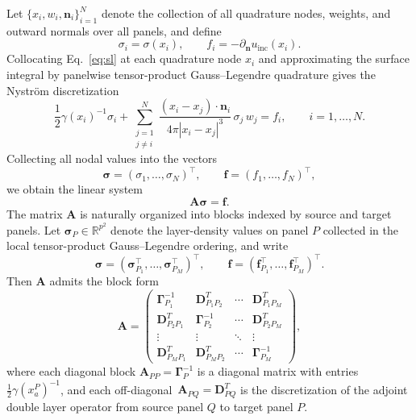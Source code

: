 \documentclass[preprint,12pt]{elsarticle}
\newcommand{\V}[1]{\boldsymbol{#1}}
\newcommand{\M}[1]{\boldsymbol{#1}}
\begin{document}
Let $\{x_i,w_i,\V{n}_i\}_{i=1}^N$ denote the collection of all quadrature nodes, weights, and outward normals over all panels, and define
\begin{equation}
\sigma_i = \sigma(x_i), \qquad
f_i = -\partial_{\V n}u_{\mathrm{inc}}(x_i).
\end{equation}
Collocating Eq.~\eqref{eq:sl} at each quadrature node $x_i$ and approximating the surface integral by panelwise tensor-product Gauss--Legendre quadrature gives the Nystr\"om discretization
\begin{equation}\label{eq:nystrom_discrete}
    \frac{1}{2}\gamma(x_i)^{-1}\sigma_i
    +
    \sum_{\substack{j=1 \\ j\neq i}}^{N}
    \frac{(x_i-x_j)\cdot \V{n}_i}{4\pi |x_i-x_j|^3}\,
    \sigma_j\,w_j
    =
    f_i,
    \qquad i=1,\dots,N.
\end{equation}
Collecting all nodal values into the vectors
\begin{equation}
\V{\sigma} = (\sigma_1,\dots,\sigma_N)^\top,
\qquad
\V{f} = (f_1,\dots,f_N)^\top,
\end{equation}
we obtain the linear system
\begin{equation}\label{eq:linsys}
    \M{A}\V{\sigma} = \V{f}.
\end{equation}
The matrix $\M A$ is naturally organized into blocks indexed by source and target panels.
Let $\V\sigma_P\in\mathbb{R}^{p^2}$ denote the layer-density values on panel $P$ collected in the local tensor-product Gauss--Legendre ordering, and write
\begin{equation}
    \V\sigma = (\V\sigma_{P_1}^\top,\dots,\V\sigma_{P_M}^\top)^\top,
    \qquad
    \V f = (\V f_{P_1}^\top,\dots,\V f_{P_M}^\top)^\top.
\end{equation}
Then $\M A$ admits the block form
\begin{equation}\label{eq:linsys_blocked}
    \M A =
    \begin{pmatrix}
        \M \Gamma^{-1}_{P_1} & \M D^T_{P_1 P_2} & \cdots & \M D^T_{P_1 P_M}\\
        \M D^T_{P_2 P_1} & \M \Gamma^{-1}_{P_2} & \cdots & \M D^T_{P_2 P_M}\\
        \vdots         & \vdots         & \ddots & \vdots\\
        \M D^T_{P_M P_1} & \M D^T_{P_M P_2} & \cdots & \M \Gamma^{-1}_{P_M}
    \end{pmatrix},
\end{equation}
where each diagonal block $\M A_{PP} = \M \Gamma^{-1}_{P}$ is a diagonal matrix with entries $\frac{1}{2}\gamma(x_a^P)^{-1}$, and each off-diagonal~$\M A_{PQ} = \M D^T_{PQ}$ is the discretization of the adjoint double layer operator from source panel $Q$ to target panel $P$.
\end{document}
